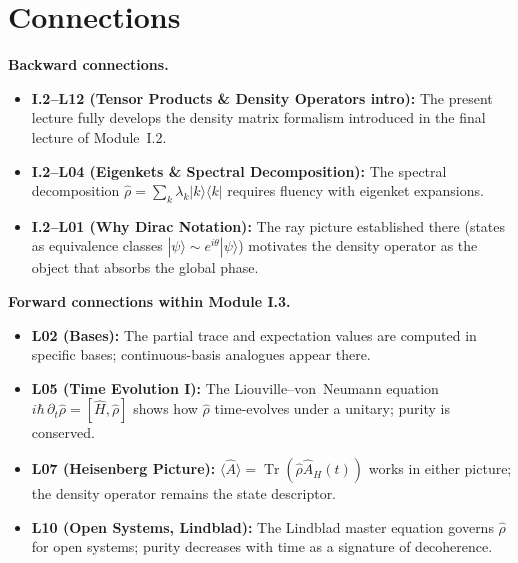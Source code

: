 \documentclass[11pt,a4paper]{article}
\begin{document}
\newpage
\section{Connections}
\label{sec:L01.4}

\begin{tcolorbox}[goldbox]
\textbf{Backward connections.}
\begin{itemize}[leftmargin=1.5em,itemsep=3pt]
  \item \textbf{I.2--L12 (Tensor Products \& Density Operators intro):}
    The present lecture fully develops the density matrix formalism
    introduced in the final lecture of Module~I.2.
  \item \textbf{I.2--L04 (Eigenkets \& Spectral Decomposition):}
    The spectral decomposition $\hat{\rho}=\sum_k\lambda_k|k\rangle\langle k|$
    requires fluency with eigenket expansions.
  \item \textbf{I.2--L01 (Why Dirac Notation):}
    The ray picture established there (states as equivalence classes
    $|\psi\rangle\sim e^{i\theta}|\psi\rangle$) motivates the density operator
    as the object that absorbs the global phase.
\end{itemize}
\end{tcolorbox}

\medskip
\begin{tcolorbox}[goldbox]
\textbf{Forward connections within Module I.3.}
\begin{itemize}[leftmargin=1.5em,itemsep=3pt]
  \item \textbf{L02 (Bases):}
    The partial trace and expectation values are computed in specific
    bases; continuous-basis analogues appear there.
  \item \textbf{L05 (Time Evolution I):}
    The Liouville--von~Neumann equation $i\hbar\,\partial_t\hat{\rho}=[\hat{H},\hat{\rho}]$
    shows how $\hat{\rho}$ time-evolves under a unitary; purity is conserved.
  \item \textbf{L07 (Heisenberg Picture):}
    $\langle\hat{A}\rangle=\operatorname{Tr}(\hat{\rho}\hat{A}_H(t))$ works in
    either picture; the density operator remains the state descriptor.
  \item \textbf{L10 (Open Systems, Lindblad):}
    The Lindblad master equation governs $\hat{\rho}$ for open systems;
    purity decreases with time as a signature of decoherence.
\end{itemize}
\end{tcolorbox}
\end{document}
